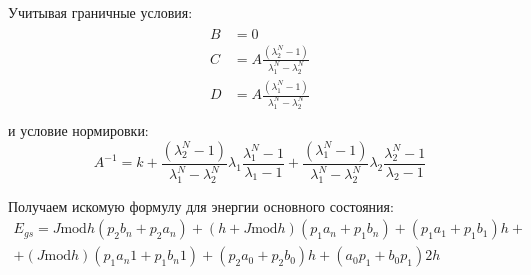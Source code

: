 Учитывая граничные условия:
\begin{align}
\begin{split}
B&=0 \\
C&=A \frac{\left(\lambda_2^N-1\right)}{\lambda_1^N-\lambda_2^N} \\
D&=A\frac{\left(\lambda_1^N-1\right)}{\lambda_1^N-\lambda_2^N} \\
\end{split}
\end{align}
и условие нормировки:
\begin{equation}
	A^{-1} = k+\frac{\left(\lambda_2^N-1\right)}{\lambda_1^N-\lambda_2^N}\lambda_1 \frac{\lambda_1^N-1}{\lambda_1-1}+\frac{\left(\lambda_1^N-1\right)}{\lambda_1^N-\lambda_2^N}\lambda_2 \frac{\lambda_2^N-1}{\lambda_2-1}
\end{equation}

Получаем искомую формулу для энергии основного состояния:
\begin{multline}
E_{gs} = J\text{mod} h (p_2 b_n+p_2 a_n) + (h +  J\text{mod} h) (p_1 a_n+p_1 b_n)+(p_1  a_1+p_1  b_1) h +\\+(J\text{mod} h) (p_1 a_n1+p_1 b_n1) + (p_2  a_0+p_2  b_0) h+( a_0 p_1+ b_0 p_1) 2 h
\end{multline}
 

